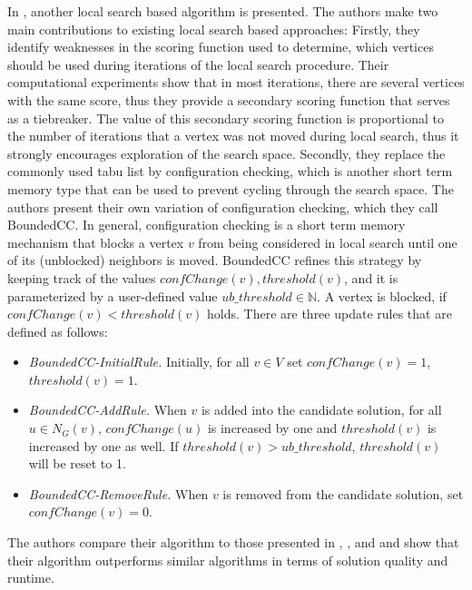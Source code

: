 \documentclass[draft,final]{vutinfth} %
\begin{document}
In \cite{chen_nuqclq_2021}, another local search based algorithm is presented. The authors make two main contributions to existing local search based approaches: Firstly, they identify weaknesses in the scoring function used to determine, which vertices should be used during iterations of the local search procedure. Their computational experiments show that in most iterations, there are several vertices with the same score, thus they provide a secondary scoring function that serves as a tiebreaker. The value of this secondary scoring function is proportional to the number of iterations that a vertex was not moved during local search, thus it strongly encourages exploration of the search space. Secondly, they replace the commonly used tabu list by configuration checking, which is another short term memory type that can be used to prevent cycling through the search space. The authors present their own variation of configuration checking, which they call BoundedCC. 
In general, configuration checking is a short term memory mechanism that blocks a vertex $v$ from being considered in local search until one of its (unblocked) neighbors is moved. BoundedCC refines this strategy by keeping track of the values $\mathit{confChange(v)}, \mathit{threshold(v)}$, and it is parameterized by a user-defined value $\mathit{ub\_threshold} \in \mathbb{N}$. A vertex is blocked, if $\mathit{confChange(v)} < \mathit{threshold(v)}$ holds. There are three update rules that are defined as follows: 
\begin{itemize}
    \item \emph{BoundedCC-InitialRule.} Initially, for all $v \in V$ set $\mathit{confChange(v)} = 1$, \\$\mathit{threshold(v)} = 1$. 
    \item \emph{BoundedCC-AddRule.} When $v$ is added into the candidate solution, for all $u \in N_G(v)$, $\mathit{confChange(u)}$ is increased by one and $\mathit{threshold(v)}$ is increased by one as well. If $\mathit{threshold}(v) > \mathit{ub\_threshold}$, $\mathit{threshold(v)}$ will be reset to 1. 
    \item \emph{BoundedCC-RemoveRule.} When $v$ is removed from the candidate solution, set $confChange(v) = 0$. 
\end{itemize}
The authors compare their algorithm to those presented in \cite{pinto2021brkga}, \cite{djeddi_extension_2019}, and \cite{zhou_opposition-based_2020} and show that their algorithm outperforms similar algorithms in terms of solution quality and runtime. 
\end{document}
